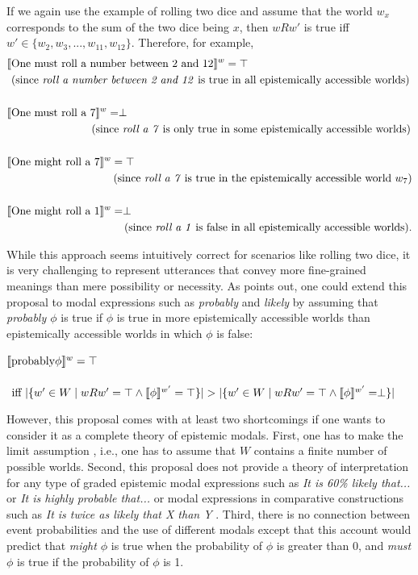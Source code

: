 If we again use the example of rolling two dice and assume that the world $w_x$ corresponds to the sum 
of the two dice being $x$, then $wRw'$ is true iff $w' \in \{w_2, w_3, ..., w_{11}, w_{12}\}$. Therefore, for example,
\begin{align*}
\llbracket&\mbox{One must roll a number between 2 and 12}\rrbracket^{w} =  \top \\
 & \mbox{(since \textit{roll a number between 2 and 12} is true in all epistemically accessible worlds)} \\ \\ 
 \llbracket&\mbox{One must roll a 7}\rrbracket^{w} =  \perp \\
 & \qquad \qquad \qquad \quad \mbox{ (since \textit{roll a 7} is only true in some epistemically accessible worlds)} \\ \\
 \llbracket&\mbox{One might roll a 7}\rrbracket^{w} =  \top \\
 &  \qquad \qquad \qquad \qquad \quad \mbox{ (since \textit{roll a 7} is true in the epistemically accessible world }w_7\mbox{)}\\ \\ 
 \llbracket&\mbox{One might roll a 1}\rrbracket^{w} =  \perp \\
 &  \qquad \qquad \qquad \qquad \qquad \mbox{\  (since \textit{roll a 1} is false in all epistemically accessible worlds).}
\end{align*}

While this approach seems intuitively correct for scenarios like rolling two dice, it is very challenging to represent utterances
that convey more fine-grained meanings than mere possibility or necessity. As \textcite{Lassiter2016} points out, one could extend this proposal
to modal expressions such as \textit{probably} and \textit{likely} by assuming that \textit{probably $\phi$} is true if $\phi$ is true in more 
epistemically accessible worlds than epistemically accessible worlds in which $\phi$ is false:
\begin{exe}
\ex $\llbracket\mbox{probably} \phi\rrbracket^{w}  = \top $ \\ 
 \ \ \ \ \ \ \ \ $ \mbox{ iff } |\{w' \in W \mid wRw' = \top \land \llbracket\phi\rrbracket^{w'} = \top\}| > |\{w' \in W \mid wRw' = \top \land \llbracket\phi\rrbracket^{w'} = \perp\}|$
\end{exe}
However, this proposal comes with at least two shortcomings if one wants to consider it as a 
complete theory of epistemic modals. First, one has to make the limit assumption \cite{Lewis1981}, i.e., 
one has to assume that $W$ contains a finite number of possible worlds. Second, this proposal does not provide 
a theory of interpretation for any type of graded epistemic modal expressions such as \textit{It is 60\% likely that...} or \textit{It is highly probable that...}
or modal expressions in comparative constructions such as \textit{It is twice as likely that X than Y} \cite{Lassiter2016}. Third, there
is no connection between event probabilities and the use of different modals except that this account would predict that \textit{might $\phi$} is true
when the probability of $\phi$ is greater than 0, and \textit{must $\phi$} is true if the probability of $\phi$ is 1.

